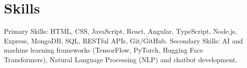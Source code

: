 \documentclass[a4paper,12pt]{article}
\begin{document}


\section{Skills}

Primary Skills: HTML, CSS, JavaScript, React, Angular, TypeScript, Node.js, Express, MongoDB, SQL, RESTful APIs, Git/GitHub.  
Secondary Skills: AI and machine learning frameworks (TensorFlow, PyTorch, Hugging Face Transformers), Natural Language Processing (NLP) and chatbot development.



\end{document}
